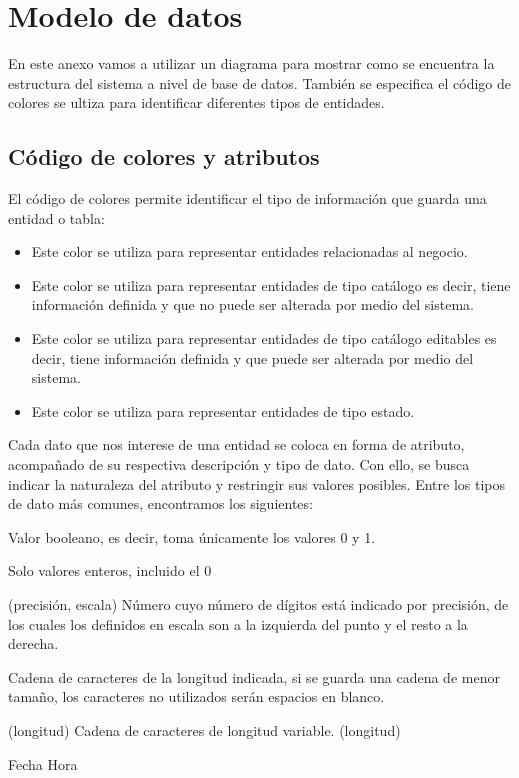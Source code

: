 \chapter{Modelo de datos}
En este anexo vamos a utilizar un diagrama para mostrar como se encuentra la estructura del sistema a nivel de base de datos. 
También se especifica el código de colores se ultiza para identificar diferentes tipos de entidades.

\section{Código de colores y atributos}

El código de colores permite identificar el tipo de información que guarda una entidad o tabla:


\begin{itemize}
    \item \IUEntidaB{} Este color se utiliza para representar entidades relacionadas al negocio.
    \item \IUEntidaA{} Este color se utiliza para representar entidades de tipo catálogo es decir, tiene información definida 
    y que no puede ser alterada por medio del sistema.
    \item \IUEntidaC{} Este color se utiliza para representar entidades de tipo catálogo editables es decir, tiene información definida 
    y que puede ser alterada por medio del sistema.
    \item \IUEntidaD{} Este color se utiliza para representar entidades de tipo estado.
\end{itemize}

Cada dato que nos interese de una entidad se coloca en forma de atributo, acompañado de su respectiva descripción y tipo de dato. Con ello, se busca indicar la naturaleza del atributo y restringir sus valores posibles. Entre los tipos de dato más comunes, encontramos los siguientes:

    \begin{bGlosario}
	    Valor booleano, es decir, toma únicamente los valores 0 y 1.

            Solo valores enteros, incluido el 0
            
         (precisión, escala)
            Número cuyo número de dígitos está indicado por precisión, de los cuales
            los definidos en escala son a la izquierda del punto y el resto a la derecha.
            
            Cadena de caracteres de la longitud indicada, si se guarda una cadena de menor
            tamaño, los caracteres no utilizados serán espacios en blanco.
            
         (longitud)
            Cadena de caracteres de longitud variable. 
         (longitud)
            
         Fecha
         Hora
    \end{bGlosario}

